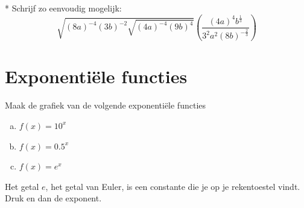 \documentclass[12pt,twoside]{article}
\begin{document}
\begin{oefening}*
Schrijf zo eenvoudig mogelijk:
$$\sqrt{\left(8a\right)^{-4}\left(3b\right)^{-2}\sqrt{\left(4a\right)^{-4}\left(9b\right)^4}}\left(\dfrac{\left(4a\right)^4b^{\frac{1}{3}}}{3^2a^2\left(8b\right)^{-\frac{2}{3}}}\right)$$
\end{oefening}

\pagebreak
\section{Exponentiële functies}

\begin{oefening}
Maak de grafiek van de volgende exponentiële functies
\begin{multicols}{3}
\begin{enumerate}[(a)]
  \itemsep.5em
  \item $f(x)=10^x$
  \item $f(x)=0.5^x$
  \item $f(x)=e^x$
\end{enumerate}
\end{multicols}
Het getal $e$, het getal van Euler, is een constante die je op je rekentoestel vindt. Druk   en dan de exponent.
\end{oefening}
\end{document}
